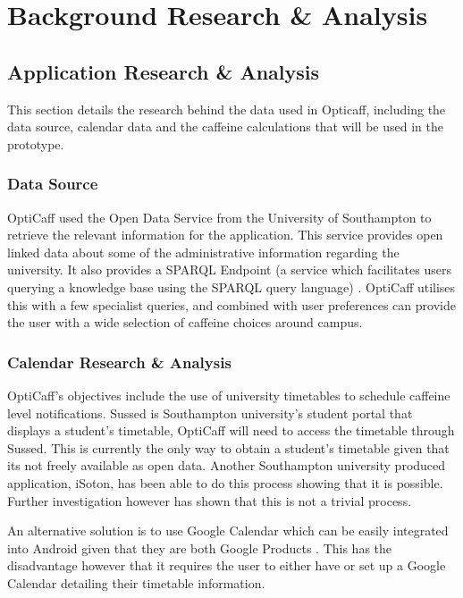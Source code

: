 \section{Background Research \& Analysis}

\subsection{Application Research \& Analysis}
This section details the research behind the data used in Opticaff, including the data source, calendar data and the caffeine calculations that will be used in the prototype. 

\subsubsection{Data Source}
\label{sec:Data}
OptiCaff used the Open Data Service from the University of Southampton \cite{DataSouthampton} to retrieve the relevant information for the application. This service provides open linked data about some of the administrative information regarding the university. It also provides a SPARQL Endpoint \cite{SotonSparql} (a service which facilitates users querying a knowledge base using the SPARQL query language) \cite{SparqlEndpoint}. OptiCaff utilises this with a few specialist queries, and combined with user preferences can provide the user with a wide selection of caffeine choices around campus. 

\subsubsection{Calendar Research \& Analysis}
\label{sec:calendar}
OptiCaff’s objectives include the use of university timetables to schedule caffeine level notifications. 
Sussed is Southampton university’s student portal that displays a student’s timetable, OptiCaff will need to access the timetable through Sussed. 
This is currently the only way to obtain a student's timetable given that its not freely available as open data. 
Another Southampton university produced application, iSoton, has been able to do this process showing that it is possible.
Further investigation however has shown that this is not a trivial process.

An alternative solution is to use Google Calendar which can be easily integrated into Android given that they are both Google Products \cite{calendar}.
This has the disadvantage however that it requires the user to either have or set up a Google Calendar detailing their timetable information. 
 
